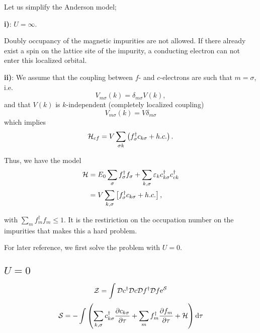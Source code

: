 Let us simplify the Anderson model;

\textbf{i)}: $U = \infty$.

Doubly occupancy of the magnetic impurities are not allowed. If there already exist a spin on the lattice site of the impurity, a conducting electron can not enter this localized orbital.

\textbf{ii)}: We assume that the coupling between $f$- and $c$-electrons are such that $m = \sigma$,  i.e. 
\begin{equation}
	V_{m\sigma}(k) =\delta_{m\sigma}V(k), 
\end{equation}
and that $V(k)$ is $k$-independent (completely localized coupling)
\begin{equation}
	V_{m\sigma}(k) = V\delta_{m\sigma}
\end{equation}
which implies
\begin{equation}
	\mathcal{H}_{cf} = V\sum_{\sigma k}\left(f_\sigma^\dagger c_{k\sigma} + h.c.\right).
\end{equation}

Thus, we have the model 
\begin{align}
	\begin{split}
	\mathcal{H} &= E_0\sum_{\sigma}f_\sigma^\dagger f_\sigma + \sum_{k,\sigma}\varepsilon_k c_{k\sigma}^\dagger c_{ck}^\dagger \\
	&= V\sum_{k,\sigma}\left[f_{\sigma}^\dagger c_{k\sigma} + h.c. \right],
	\end{split}
\end{align}

with \(\sum_mf_m^\dagger f_m \leq 1 \). It is the restiriction on the occupation number on the impurities that makes this a hard problem.

For later reference, we first solve the problem with $U = 0$.
\subsection{$U = 0$}

\begin{equation}
\mathcal{Z} = \int \mathcal{D} c^\dagger \mathcal{D} c\mathcal{D} f^\dagger \mathcal{D} f\mathrm{e}^{\mathcal{S}}
\end{equation}
\begin{equation}
\mathcal{S} = -\int\left(\sum_{k,\sigma}c_{k\sigma}^\dagger\pdv{c_{k\sigma}}{\tau} + \sum_mf_m^\dagger \pdv{f_m}{\tau} + \mathcal{H} \right)\dd{\tau}
\end{equation}

